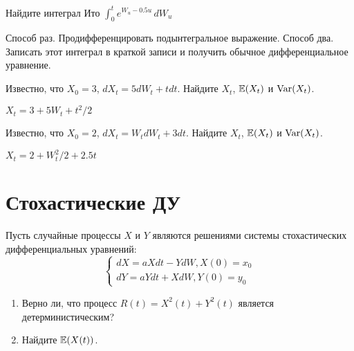 \begin{problem}
Найдите интеграл Ито $\int_0^t e^{W_u - 0.5 u} \, dW_u$


\begin{sol}
Способ раз. Продифференцировать подынтегральное выражение. Способ два. Записать этот интеграл в краткой записи и получить обычное дифференциальное уравнение.
\end{sol}
\end{problem}

\begin{problem}
  Известно, что $X_0=3$, $dX_t = 5dW_t + tdt$. Найдите $X_t$, $\mathbb{E}(X_t)$ и $\operatorname{Var}(X_t)$.
\begin{sol}
  $X_t = 3 + 5W_t + t^2/2$
\end{sol}
\end{problem}

\begin{problem}
  Известно, что $X_0=2$, $dX_t = W_tdW_t + 3dt$. Найдите $X_t$, $\mathbb{E}(X_t)$ и $\operatorname{Var}(X_t)$.
\begin{sol}
  $X_t = 2 + W_t^2/2 + 2.5t$
\end{sol}
\end{problem}


\section{Стохастические ДУ}

\begin{problem}
Пусть случайные процессы $X$ и $Y$ являются решениями системы стохастических дифференциальных уравнений:
\[
\begin{cases}
dX=aXdt-YdW, X(0)=x_{0} \\
dY=aYdt+XdW, Y(0)=y_{0}
\end{cases}
\]
\begin{enumerate}
\item Верно ли, что процесс $R(t)=X^{2}(t)+Y^{2}(t)$ является детерминистическим?
\item Найдите $\mathbb{E}(X(t))$.
\end{enumerate}


\begin{sol}

\end{sol}
\end{problem}

